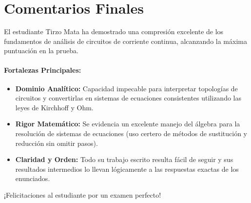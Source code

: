 \documentclass[12pt,a4paper]{article}
\begin{document}
\newpage

\section*{Comentarios Finales}

El estudiante Tirzo Mata ha demostrado una compresión excelente de los fundamentos de análisis de circuitos de corriente continua, alcanzando la máxima puntuación en la prueba.

\paragraph{Fortalezas Principales:}
\begin{itemize}
    \item \textbf{Dominio Analítico:} Capacidad impecable para interpretar topologías de circuitos y convertirlas en sistemas de ecuaciones consistentes utilizando las leyes de Kirchhoff y Ohm.
    \item \textbf{Rigor Matemático:} Se evidencia un excelente manejo del álgebra para la resolución de sistemas de ecuaciones (uso certero de métodos de sustitución y reducción sin omitir pasos). 
    \item \textbf{Claridad y Orden:} Todo su trabajo escrito resulta fácil de seguir y sus resultados intermedios lo llevan lógicamente a las respuestas exactas de los enunciados.
\end{itemize}

¡Felicitaciones al estudiante por un examen perfecto!
\end{document}
